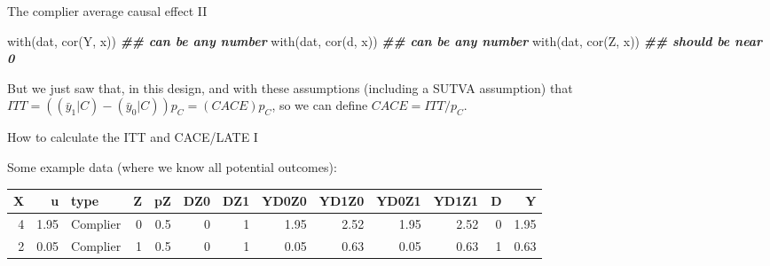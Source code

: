 \documentclass[
  ignorenonframetext,
]{beamer}
\newenvironment{Shaded}{\begin{snugshade}}{\end{snugshade}}
\newcommand{\DocumentationTok}[1]{\textcolor[rgb]{0.56,0.35,0.01}{\textbf{\textit{#1}}}}
\newcommand{\FunctionTok}[1]{\textcolor[rgb]{0.00,0.00,0.00}{#1}}
\newcommand{\NormalTok}[1]{#1}
\begin{document}
\begin{frame}[fragile]{The complier average causal effect II}
\protect\hypertarget{the-complier-average-causal-effect-ii}{}
\scriptsize

\begin{Shaded}
\begin{Highlighting}[]
\FunctionTok{with}\NormalTok{(dat, }\FunctionTok{cor}\NormalTok{(Y, x)) }\DocumentationTok{\#\# can be any number}
\FunctionTok{with}\NormalTok{(dat, }\FunctionTok{cor}\NormalTok{(d, x)) }\DocumentationTok{\#\# can be any number}
\FunctionTok{with}\NormalTok{(dat, }\FunctionTok{cor}\NormalTok{(Z, x)) }\DocumentationTok{\#\# should be near 0}
\end{Highlighting}
\end{Shaded}

\normalsize

But we just saw that, in this design, and with these assumptions
(including a SUTVA assumption) that
\(ITT = ( (\bar{y}_{1}|C) - (\bar{y}_{0}|C))p_C = (CACE) p_C\), so we
can define \(CACE=ITT/p_C\).
\end{frame}

\begin{frame}{How to calculate the ITT and CACE/LATE I}
\protect\hypertarget{how-to-calculate-the-itt-and-cacelate-i}{}
\scriptsize\normalsize

Some example data (where we know all potential outcomes):

\scriptsize
\begin{tabular}{r|r|l|r|r|r|r|r|r|r|r|r|r}
\hline
X & u & type & Z & pZ & DZ0 & DZ1 & YD0Z0 & YD1Z0 & YD0Z1 & YD1Z1 & D & Y\\
\hline
4 & 1.95 & Complier & 0 & 0.5 & 0 & 1 & 1.95 & 2.52 & 1.95 & 2.52 & 0 & 1.95\\
\hline
2 & 0.05 & Complier & 1 & 0.5 & 0 & 1 & 0.05 & 0.63 & 0.05 & 0.63 & 1 & 0.63\\
\hline
\end{tabular}

\normalsize
\end{frame}
\end{document}
